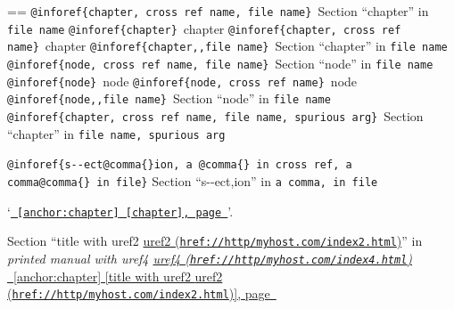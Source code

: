 \documentclass{book}
\makeatletter
\newenvironment{Texinfopreformatted}{%
  \par\GNUTobeylines\obeyspaces\frenchspacing\parskip=\z@\parindent=\z@}{}
{\catcode`\^^M=13 \gdef\GNUTobeylines{\catcode`\^^M=13 \def^^M{\null\par}}}
\newenvironment{Texinfoindented}{\begin{list}{}{}\item\relax}{\end{list}}
\renewcommand{\_}{\Texinfounderscore\discretionary{}{}{}}
\makeatother
\begin{document}
{{\begin{Texinfoindented}
\begin{Texinfopreformatted}
\texttt{@inforef\{chapter,\ cross ref name,\ file name\}}\ Section ``chapter'' in \texttt{file name}
\texttt{@inforef\{chapter\}}\ chapter
\texttt{@inforef\{chapter,\ cross ref name\}}\ chapter
\texttt{@inforef\{chapter{,}{,}file name\}}\ Section ``chapter'' in \texttt{file name}
\texttt{@inforef\{node,\ cross ref name,\ file name\}}\ Section ``node'' in \texttt{file name}
\texttt{@inforef\{node\}}\ node
\texttt{@inforef\{node,\ cross ref name\}}\ node
\texttt{@inforef\{node{,}{,}file name\}}\ Section ``node'' in \texttt{file name}
\texttt{@inforef\{chapter,\ cross ref name,\ file name,\ spurious arg\}}\ Section ``chapter'' in \texttt{file name,\ spurious arg}

\texttt{@inforef\{s{-}{-}ect@comma\{\}ion,\ a @comma\{\}\ in cross
ref,\ a comma@comma\{\}\ in file\}}
Section ``s{-}{-}ect,ion'' in \texttt{a comma,\ in file}

`\texttt{\hyperref[anchor:chapter]{\chaptername~\ref*{anchor:chapter} [chapter], page~\pageref*{anchor:chapter}}}'.

Section ``title with uref2 \href{href://http/myhost.com/index2.html}{uref2 (\nolinkurl{href://http/myhost.com/index2.html})}'' in \textsl{printed manual with uref4 \href{href://http/myhost.com/index4.html}{uref4 (\nolinkurl{href://http/myhost.com/index4.html})}}
\hyperref[anchor:chapter]{\chaptername~\ref*{anchor:chapter} [title with uref2 \href{href://http/myhost.com/index2.html}{uref2 (\nolinkurl{href://http/myhost.com/index2.html})}], page~\pageref*{anchor:chapter}}


\end{Texinfopreformatted}
\end{Texinfoindented}}}
\end{document}
